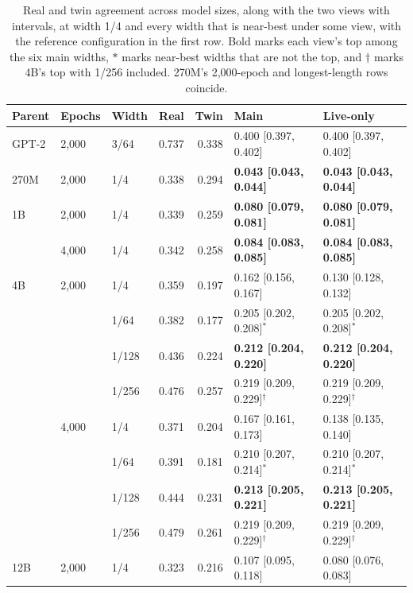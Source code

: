 \begin{table}[!htbp]
  \caption{Real and twin agreement across model sizes, along with the two views with intervals, at width 1/4 and every width that is near-best under some view, with the reference configuration in the first row. Bold marks each view's top among the six main widths, $\ast$ marks near-best widths that are not the top, and $\dagger$ marks 4B's top with 1/256 included. 270M's 2,000-epoch and longest-length rows coincide.}
  \label{tab:app-size}
  \centering
  \small
  \begin{tabular}{@{}lll*{2}{@{\hspace{5pt}}r}*{2}{@{\hspace{5pt}}l}@{}}
    \toprule
    Parent & Epochs & Width & Real & Twin & Main & Live-only \\
    \midrule
    GPT-2 & 2,000 & 3/64 & 0.737 & 0.338 & 0.400 [0.397, 0.402] & 0.400 [0.397, 0.402] \\
    \midrule
    270M & 2,000 & 1/4 & 0.338 & 0.294 & \textbf{0.043 [0.043, 0.044]} & \textbf{0.043 [0.043, 0.044]} \\
    1B & 2,000 & 1/4 & 0.339 & 0.259 & \textbf{0.080 [0.079, 0.081]} & \textbf{0.080 [0.079, 0.081]} \\
    & 4,000 & 1/4 & 0.342 & 0.258 & \textbf{0.084 [0.083, 0.085]} & \textbf{0.084 [0.083, 0.085]} \\
    4B & 2,000 & 1/4 & 0.359 & 0.197 & 0.162 [0.156, 0.167] & 0.130 [0.128, 0.132] \\
    & & 1/64 & 0.382 & 0.177 & 0.205 [0.202, 0.208]$^\ast$ & 0.205 [0.202, 0.208]$^\ast$ \\
    & & 1/128 & 0.436 & 0.224 & \textbf{0.212 [0.204, 0.220]} & \textbf{0.212 [0.204, 0.220]} \\
    & & 1/256 & 0.476 & 0.257 & 0.219 [0.209, 0.229]$^\dagger$ & 0.219 [0.209, 0.229]$^\dagger$ \\
    & 4,000 & 1/4 & 0.371 & 0.204 & 0.167 [0.161, 0.173] & 0.138 [0.135, 0.140] \\
    & & 1/64 & 0.391 & 0.181 & 0.210 [0.207, 0.214]$^\ast$ & 0.210 [0.207, 0.214]$^\ast$ \\
    & & 1/128 & 0.444 & 0.231 & \textbf{0.213 [0.205, 0.221]} & \textbf{0.213 [0.205, 0.221]} \\
    & & 1/256 & 0.479 & 0.261 & 0.219 [0.209, 0.229]$^\dagger$ & 0.219 [0.209, 0.229]$^\dagger$ \\
    12B & 2,000 & 1/4 & 0.323 & 0.216 & 0.107 [0.095, 0.118] & 0.080 [0.076, 0.083] \\

\end{tabular}
\end{table}
